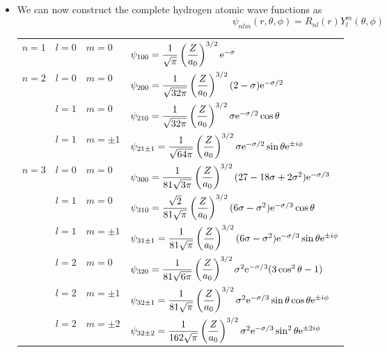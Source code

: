 \documentclass[../notes.tex]{subfiles}
\begin{document}
\begin{itemize}
\begin{itemize}
\begin{itemize}
        \end{itemize}
    \end{itemize}
    \item We can now construct the complete hydrogen atomic wave functions as
    \begin{equation*}
        \psi_{nlm}(r,\theta,\phi) = R_{nl}(r)Y_l^m(\theta,\phi)
    \end{equation*}
    \begin{table}[h!]
        \centering
        \small
        \renewcommand{\arraystretch}{2.5}
        \begin{tabular}{llll}
            \toprule
            $n=1$ & $l=0$ & $m=0$ & $\psi_{100}=\dfrac{1}{\sqrt{\pi}}\left( \dfrac{Z}{a_0} \right)^{3/2}\e[-\sigma]$\\
            $n=2$ & $l=0$ & $m=0$ & $\psi_{200}=\dfrac{1}{\sqrt{32\pi}}\left( \dfrac{Z}{a_0} \right)^{3/2}(2-\sigma)\e[-\sigma/2]$\\
                  & $l=1$ & $m=0$ & $\psi_{210}=\dfrac{1}{\sqrt{32\pi}}\left( \dfrac{Z}{a_0} \right)^{3/2}\sigma\e[-\sigma/2]\cos\theta$\\
                  & $l=1$ & $m=\pm 1$ & $\psi_{21\pm 1}=\dfrac{1}{\sqrt{64\pi}}\left( \dfrac{Z}{a_0} \right)^{3/2}\sigma\e[-\sigma/2]\sin\theta\e[\pm i\phi]$\\
            $n=3$ & $l=0$ & $m=0$ & $\psi_{300}=\dfrac{1}{81\sqrt{3\pi}}\left( \dfrac{Z}{a_0} \right)^{3/2}(27-18\sigma+2\sigma^2)\e[-\sigma/3]$\\
                  & $l=1$ & $m=0$ & $\psi_{310}=\dfrac{\sqrt{2}}{81\sqrt{\pi}}\left( \dfrac{Z}{a_0} \right)^{3/2}(6\sigma-\sigma^2)\e[-\sigma/3]\cos\theta$\\
                  & $l=1$ & $m=\pm 1$ & $\psi_{31\pm 1}=\dfrac{1}{81\sqrt{\pi}}\left( \dfrac{Z}{a_0} \right)^{3/2}(6\sigma-\sigma^2)\e[-\sigma/3]\sin\theta\e[\pm i\phi]$\\
                  & $l=2$ & $m=0$ & $\psi_{320}=\dfrac{1}{81\sqrt{6\pi}}\left( \dfrac{Z}{a_0} \right)^{3/2}\sigma^2\e[-\sigma/3](3\cos^2\theta-1)$\\
                  & $l=2$ & $m=\pm 1$ & $\psi_{32\pm 1}=\dfrac{1}{81\sqrt{\pi}}\left( \dfrac{Z}{a_0} \right)^{3/2}\sigma^2\e[-\sigma/3]\sin\theta\cos\theta\e[\pm i\phi]$\\
                  & $l=2$ & $m=\pm 2$ & $\psi_{32\pm 2}=\dfrac{1}{162\sqrt{\pi}}\left( \dfrac{Z}{a_0} \right)^{3/2}\sigma^2\e[-\sigma/3]\sin^2\theta\e[\pm 2i\phi]$\\
            \bottomrule
        \end{tabular}

\end{table}
\end{itemize}
\end{document}
